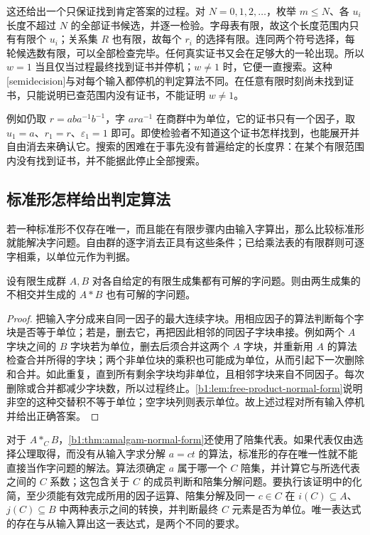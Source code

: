 这还给出一个只保证找到肯定答案的过程。对 \(N=0,1,2,\ldots\)，枚举 \(m\leq N\)、各 \(u_i\) 长度不超过 \(N\) 的全部证书候选，并逐一检验。字母表有限，故这个长度范围内只有有限个 \(u_i\)；关系集 \(R\) 也有限，故每个 \(r_i\) 的选择有限。连同两个符号选择，每轮候选数有限，可以全部检查完毕。任何真实证书又会在足够大的一轮出现。所以 \(w=1\) 当且仅当过程最终找到证书并停机；\(w\ne1\) 时，它便一直搜索。这种[semidecision]与对每个输入都停机的判定算法不同。在任意有限时刻尚未找到证书，只能说明已查范围内没有证书，不能证明 \(w\ne1\)。

\ProseParagraphBreak
例如仍取 \(r=aba^{-1}b^{-1}\)，字 \(ara^{-1}\) 在商群中为单位，它的证书只有一个因子，取 \(u_1=a\)、\(r_1=r\)、\(\varepsilon_1=1\) 即可。即使检验者不知道这个证书怎样找到，也能展开并自由消去来确认它。搜索的困难在于事先没有普遍给定的长度界：在某个有限范围内没有找到证书，并不能据此停止全部搜索。

\subsection{标准形怎样给出判定算法}
\label{b1:subsec:C03:02}

若一种标准形不仅存在唯一，而且能在有限步骤内由输入字算出，那么比较标准形就能解决字问题。自由群的逐字消去正具有这些条件；已给乘法表的有限群则可逐字相乘，以单位元作为判据。

\begin{proposition}\label{b1:prop:C-free-product-word-problem}
	设有限生成群 \(A,B\) 对各自给定的有限生成集都有可解的字问题。则由两生成集的不相交并生成的 \(A*B\) 也有可解的字问题。
\end{proposition}

\begin{proof}
	把输入字分成来自同一因子的最大连续字块。用相应因子的算法判断每个字块是否等于单位；若是，删去它，再把因此相邻的同因子字块串接。例如两个 \(A\) 字块之间的 \(B\) 字块若为单位，删去后须合并这两个 \(A\) 字块，并重新用 \(A\) 的算法检查合并所得的字块；两个非单位块的乘积也可能成为单位，从而引起下一次删除和合并。如此重复，直到所有剩余字块均非单位，且相邻字块来自不同因子。每次删除或合并都减少字块数，所以过程终止。\cref{b1:lem:free-product-normal-form}说明非空的这种交替积不等于单位；空字块列则表示单位。故上述过程对所有输入停机并给出正确答案。
\end{proof}

对于 \(A*_C B\)，\cref{b1:thm:amalgam-normal-form}还使用了陪集代表。如果代表仅由选择公理取得，而没有从输入字求分解 \(a=ct\) 的算法，标准形的存在唯一性就不能直接当作字问题的解法。算法须确定 \(a\) 属于哪一个 \(C\) 陪集，并计算它与所选代表之间的 \(C\) 系数；这包含关于 \(C\) 的成员判断和陪集分解问题。要执行该证明中的化简，至少须能有效完成所用的因子运算、陪集分解及同一 \(c\in C\) 在 \(i(C)\subseteq A\)、\(j(C)\subseteq B\) 中两种表示之间的转换，并判断最终 \(C\) 元素是否为单位。唯一表达式的存在与从输入算出这一表达式，是两个不同的要求。

